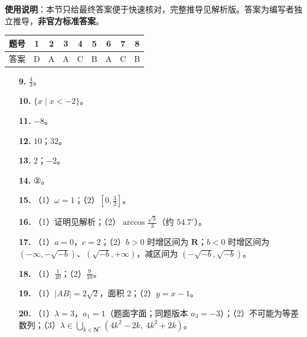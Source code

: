 
\begin{gknotice}
\textbf{使用说明}：本节只给最终答案便于快速核对，完整推导见解析版。答案为编写者独立推导，\textbf{非官方标准答案}。
\end{gknotice}

\begin{center}\begin{tabular}{ccccccccc}
\toprule
题号 & 1 & 2 & 3 & 4 & 5 & 6 & 7 & 8 \\
\midrule
答案 & D & A & A & C & B & A & C & B \\
\bottomrule
\end{tabular}\end{center}

\begin{itemize}[leftmargin=2.6em]
  \item[\textbf{9.}] $\frac43$。
  \item[\textbf{10.}] $\{x\mid x<-2\}$。
  \item[\textbf{11.}] $-8$。
  \item[\textbf{12.}] $10$；$32$。
  \item[\textbf{13.}] $2$；$-2$。
  \item[\textbf{14.}] ②。
\end{itemize}

\begin{itemize}[leftmargin=2.6em]
  \item[\textbf{15.}] （1）$\omega=1$；（2）$\left[0,\frac32\right]$。
  \item[\textbf{16.}] （1）证明见解析；（2）$\arccos\frac{\sqrt3}{3}$（约 $54.7^\circ$）。
  \item[\textbf{17.}] （1）$a=0$，$c=2$；（2）$b>0$ 时增区间为 $\mathbf R$；$b<0$ 时增区间为 $(-\infty,-\sqrt{-b})$、$(\sqrt{-b},+\infty)$，减区间为 $(-\sqrt{-b},\sqrt{-b})$。
  \item[\textbf{18.}] （1）$\frac1{40}$；（2）$\frac9{10}$。
  \item[\textbf{19.}] （1）$|AB|=2\sqrt2$，面积 $2$；（2）$y=x-1$。
  \item[\textbf{20.}] （1）$\lambda=3$，$a_1=1$（题面字面；同题版本 $a_3=-3$）；（2）不可能为等差数列；（3）$\lambda\in\bigcup_{k\in\mathbf N^*}(4k^2-2k,\ 4k^2+2k)$。
\end{itemize}
